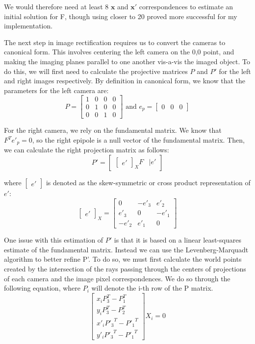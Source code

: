 \documentclass{article}
\begin{document}
We would therefore need at least 8 $\boldsymbol{x}$ and $\boldsymbol{x'}$ correspondences to estimate an 
initial solution for F, though using closer to 20 proved more successful for my implementation.

The next step in image rectification requires us to convert the cameras to canonical form. This involves
centering the left camera on the 0,0 point, and making the imaging planes parallel to one another vis-a-vis
the imaged object. To do this, we will first need to calculate the projective matrices $P$ and $P'$ for the left and right images respectively. By definition in canonical form, we know that the parameters for the left camera are:
\[ P = 
    \begin{bmatrix}
        1 & 0 & 0 & 0 \\
        0 & 1 & 0 & 0 \\
        0 & 0 & 1 & 0
    \end{bmatrix}
    \text{ and }
    e_p = \begin{bmatrix}
        0 & 0 & 0
    \end{bmatrix}
\]

For the right camera, we rely on the fundamental matrix. We know that \(F^T e'_p = 0\), so the right epipole is a null vector
of the fundamental matrix. Then, we can calculate the right projection matrix as follows: 
\[ P' = 
    \begin{bmatrix}
        \begin{bmatrix} e' \end{bmatrix} _ X F & | e'
    \end{bmatrix}
\]

where $\begin{bmatrix} e' \end{bmatrix}$ is denoted as the skew-symmetric or cross product representation of $e'$:
\[\begin{bmatrix} e' \end{bmatrix}_X =
    \begin{bmatrix}
        0 & -e'_3 & e'_2 \\
        e'_3 & 0 & -e'_1 \\
        -e'_2 & e'_1 & 0
    \end{bmatrix}
\]

One issue with this estimation of $P'$ is that it is based on a linear least-squares estimate of the fundamental matrix.
Instead we can use the Levenberg-Marquadt algorithm to better refine P'. To do so, we must first calculate the world points
created by the intersection of the rays passing through the centers of projections of each camera and the image pixel correspondences.
We do so through the following equation, where $P_i$ will denote the i-th row of the P matrix.
\[
    \begin{bmatrix}
        x_i P_3^T - P_1^T \\
        y_i P_3^T - P_2^T \\
        x'_i {P'_3}^T - {P'_1}^T \\
        y'_i {P'_3}^T - {P'_1}^T
    \end{bmatrix} X_i = 0
\]
\end{document}
